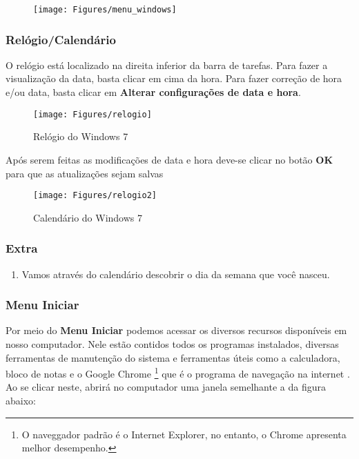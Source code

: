 \documentclass[hidelinks,12pt]{article}
\begin{document}
\begin{figure}[!h]
	\centering
	\texttt{[image: Figures/menu\_windows]}
	\label{fig:menu_windows}
\end{figure}

\subsubsection{Relógio/Calendário}

O relógio está localizado na direita inferior da barra de tarefas. Para fazer a visualização da data, basta clicar em cima da hora. Para fazer correção de hora e/ou data, basta clicar em {\bf Alterar configurações de data e hora}.

\begin{figure}[!h]
	\centering
	\texttt{[image: Figures/relogio]}
	\caption{Relógio do Windows 7}
	\label{fig:relogio}
\end{figure}

Após serem feitas as modificações de data e hora deve-se clicar no botão {\bf OK} para que as atualizações sejam salvas

\begin{figure}[!h]
	\centering
	\texttt{[image: Figures/relogio2]}
	\caption{Calendário do Windows 7}
	\label{fig:calendario}
\end{figure}

\subsubsection{Extra}
\begin{enumerate}
	\item Vamos através do calendário descobrir o dia da semana que você nasceu.
\end{enumerate}


\subsubsection{Menu Iniciar}

Por meio do \textbf{Menu Iniciar} podemos acessar os diversos recursos disponíveis em nosso computador. Nele estão contidos todos os programas instalados, diversas ferramentas de manutenção do sistema e ferramentas úteis como a calculadora, bloco de notas e o Google Chrome \footnote{O naveggador padrão é o Internet Explorer, no entanto, o Chrome apresenta melhor desempenho.} que é o programa de navegação na internet . Ao se clicar neste, abrirá no computador uma janela semelhante a da figura abaixo:
\end{document}
